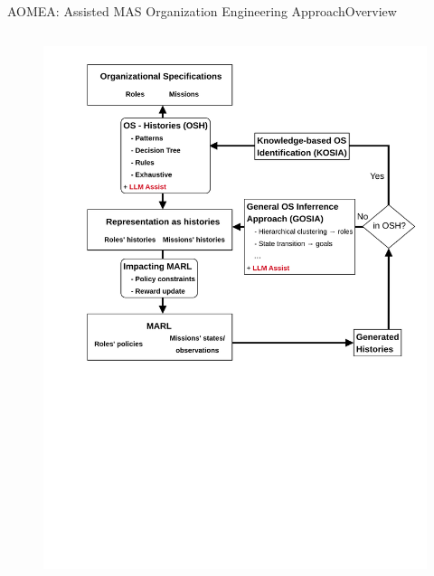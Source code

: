 \begin{frame}{AOMEA: Assisted MAS Organization Engineering Approach}{Overview}
\begin{columns}
\begin{column}{0.5\textwidth}
            \centering
            \begin{figure}
                \vspace{-4ex}
                \includegraphics[width=1.1\linewidth]{figures/prahom_overview.png}
            \end{figure}

        \end{column}

    \end{columns}

\end{frame}




